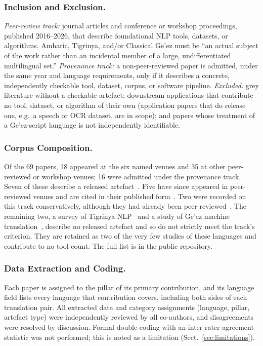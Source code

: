 \documentclass[runningheads]{llncs}
\begin{document}
\subsubsection{Inclusion and Exclusion.} \emph{Peer-review track:} journal articles and conference or workshop proceedings, published 2016--2026, that describe foundational NLP tools, datasets, or algorithms. Amharic, Tigrinya, and/or Classical Ge'ez must be ``an actual subject of the work rather than an incidental member of a large, undifferentiated multilingual set.'' \emph{Provenance track:} a non-peer-reviewed paper is admitted, under the same year and language requirements, only if it describes a concrete, independently checkable tool, dataset, corpus, or software pipeline. \emph{Excluded:} grey literature without a checkable artefact; downstream applications that contribute no tool, dataset, or algorithm of their own (application papers that do release one, e.g.\ a speech or OCR dataset, are in scope); and papers whose treatment of a Ge'ez-script language is not independently identifiable.

\subsubsection{Corpus Composition.} Of the 69 papers, 18 appeared at the six named venues and 35 at other peer-reviewed or workshop venues; 16 were admitted under the provenance track. Seven of these describe a released artefact~\cite{abedissa_amqa_2023,gete_whispering_2025,gaim_tlmd_2021,azime_amharic_2021,teklehaymanot_expanding_2026,medhanie_adapting_2026,beyene_handwritten_2019}. Five have since appeared in peer-reviewed venues and are cited in their published form~\cite{teklehaymanot_lowresource_2025,yimer_learning_2024,gashaw_amharicarabic_2019,gondere_handwritten_2019,adnew_semantically_2024}. Two were recorded on this track conservatively, although they had already been peer-reviewed~\cite{yimam_introducing_2021,kidane_exploration_2021}. The remaining two, a survey of Tigrinya NLP~\cite{gaim_tigrinya_2025} and a study of Ge'ez machine translation~\cite{wassie_machine_2023}, describe no released artefact and so do not strictly meet the track's criterion. They are retained as two of the very few studies of these languages and contribute to no tool count. The full list is in the public repository.

\subsubsection{Data Extraction and Coding.} Each paper is assigned to the pillar of its primary contribution, and its language field lists every language that contribution covers, including both sides of each translation pair. All extracted data and category assignments (language, pillar, artefact type) were independently reviewed by all co-authors, and disagreements were resolved by discussion. Formal double-coding with an inter-rater agreement statistic was not performed; this is noted as a limitation (Sect.~\ref{sec:limitations}).
\end{document}

